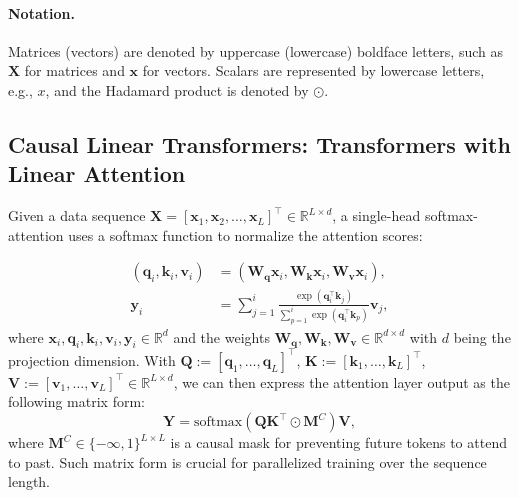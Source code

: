 


\paragraph{Notation.}
Matrices (vectors) are denoted by uppercase (lowercase) boldface letters, such as $\mathbf{X}$ for matrices and $\mathbf{x}$ for vectors. Scalars are represented by  lowercase letters, e.g., $x$, and the Hadamard product is denoted by $\odot$.



\subsection{Causal Linear Transformers: Transformers with Linear Attention} Given a data sequence \(\mathbf{X} = [\mathbf{x}_{1}, \mathbf{x}_{2}, \ldots, \mathbf{x}_{L}]^\top \in \mathbb{R}^{L\times d}\), a single-head softmax-attention uses a softmax function to normalize the attention scores:

\vspace{-5mm}
\begin{align}
    \left(\mathbf{q}_{i} , \mathbf{k}_{i} , \mathbf{v}_{i}\right) & = \left(\mathbf{W}_{ \mathbf{q}}\mathbf{x}_{i} ,  \mathbf{W}_{ \mathbf{k}}\mathbf{x}_{i} ,  \mathbf{W}_{ \mathbf{v}}\mathbf{x}_{i}\right) , \\
     \mathbf{y}_i & = \sum_{j=1}^i \frac{\exp (\mathbf{q}_{i}^{\top}\mathbf{k}_{j})}{\sum_{p=1}^i \exp( \mathbf{q}_{i}^{\top}\mathbf{k}_{p})} \mathbf{v}_j, \label{eq:attgen}
\end{align}
where $\mathbf{x}_{i} ,\mathbf{q}_{i} , \mathbf{k}_{i} , \mathbf{v}_{i}, \mathbf{y}_{i} \in \mathbb{R}^d$ and the weights $\mathbf{W}_\mathbf{q} , \mathbf{W}_\mathbf{k} , \mathbf{W}_\mathbf{v} \in \mathbb{R}^{d \times d}$ with $d$ being the projection dimension. With {$\mathbf{Q}:=[\mathbf{q}_1,\dots,\mathbf{q}_L]^\top$, $\mathbf{K}:=[\mathbf{k}_1,\dots,\mathbf{k}_L]^\top$, $\mathbf{V}:=[\mathbf{v}_1,\dots,\mathbf{v}_L]^\top \in \mathbb{R}^{L \times d}$}, we can then express the attention layer output as the following matrix form:
\begin{equation}\label{eq:attvec}
   \mathbf{Y} = \text{softmax}\left(\mathbf{Q} \mathbf{K}^\top  \odot \mathbf{M}^C \right) 
    \mathbf{V},
\end{equation}
where $\mathbf{M}^C \in \{ -\infty,1 \}^{L\times L}$ is a causal mask for preventing future tokens to attend to past. Such matrix form is crucial for parallelized training over the sequence length. 

